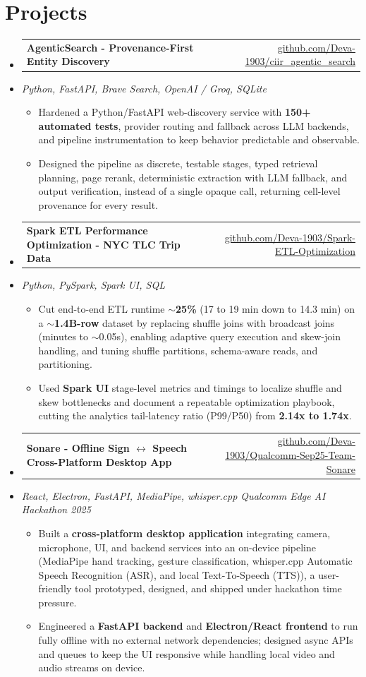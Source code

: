 \documentclass[letterpaper,10pt]{article}
\makeatletter
\newcommand{\resumeItem}[1]{
  \item\small{#1\vspace{-1pt}}
}
\newcommand{\resumeProjectHeading}[2]{
    \item
    \begin{tabular*}{0.985\textwidth}[t]{l@{\extracolsep{\fill}}r}
      \small\textbf{#1} & \small #2 \\
    \end{tabular*}\vspace{-5pt}
}
\newcommand{\resumeProjectSubheading}[1]{
  \vspace{-2pt}\item[] {\small\textcolor{ResumeSlate}{\emph{#1}}}\vspace{-3pt}
}
\newcommand{\resumeSubHeadingListStart}{\begin{itemize}[leftmargin=0.0in, label={}, itemsep=2pt, topsep=2pt]}
\newcommand{\resumeSubHeadingListEnd}{\end{itemize}}
\newcommand{\resumeItemListStart}{\begin{itemize}[leftmargin=0.18in, itemsep=2pt, topsep=1pt]}
\newcommand{\resumeItemListEnd}{\end{itemize}\vspace{-4pt}}
\makeatother
\begin{document}
\section{Projects}
\resumeSubHeadingListStart
  \resumeProjectHeading
    {AgenticSearch - Provenance-First Entity Discovery}
    {\href{https://github.com/Deva-1903/ciir_agentic_search}{github.com/Deva-1903/ciir\_agentic\_search}}
  \resumeProjectSubheading{Python, FastAPI, Brave Search, OpenAI / Groq, SQLite}
    \resumeItemListStart
      \resumeItem{Hardened a Python/FastAPI web-discovery service with \textbf{150+ automated tests}, provider routing and fallback across LLM backends, and pipeline instrumentation to keep behavior predictable and observable.}
      \resumeItem{Designed the pipeline as discrete, testable stages, typed retrieval planning, page rerank, deterministic extraction with LLM fallback, and output verification, instead of a single opaque call, returning cell-level provenance for every result.}
    \resumeItemListEnd
  \resumeProjectHeading
    {Spark ETL Performance Optimization - NYC TLC Trip Data}
    {\href{https://github.com/Deva-1903/Spark-ETL-Optimization}{github.com/Deva-1903/Spark-ETL-Optimization}}
  \resumeProjectSubheading{Python, PySpark, Spark UI, SQL}
    \resumeItemListStart
      \resumeItem{Cut end-to-end ETL runtime \textbf{$\sim$25\%} (17 to 19 min down to 14.3 min) on a \textbf{$\sim$1.4B-row} dataset by replacing shuffle joins with broadcast joins (minutes to $\sim$0.05s), enabling adaptive query execution and skew-join handling, and tuning shuffle partitions, schema-aware reads, and partitioning.}
      \resumeItem{Used \textbf{Spark UI} stage-level metrics and timings to localize shuffle and skew bottlenecks and document a repeatable optimization playbook, cutting the analytics tail-latency ratio (P99/P50) from \textbf{2.14x to 1.74x}.}
    \resumeItemListEnd
  \resumeProjectHeading
    {Sonare - Offline Sign \(\leftrightarrow\) Speech Cross-Platform Desktop App}
    {\href{https://github.com/Deva-1903/Qualcomm-Sep25-Team-Sonare}{github.com/Deva-1903/Qualcomm-Sep25-Team-Sonare}}
  \resumeProjectSubheading{React, Electron, FastAPI, MediaPipe, whisper.cpp \enspace\textbar\enspace Qualcomm Edge AI Hackathon 2025}
    \resumeItemListStart
      \resumeItem{Built a \textbf{cross-platform desktop application} integrating camera, microphone, UI, and backend services into an on-device pipeline (MediaPipe hand tracking, gesture classification, whisper.cpp Automatic Speech Recognition (ASR), and local Text-To-Speech (TTS)), a user-friendly tool prototyped, designed, and shipped under hackathon time pressure.}
      \resumeItem{Engineered a \textbf{FastAPI backend} and \textbf{Electron/React frontend} to run fully offline with no external network dependencies; designed async APIs and queues to keep the UI responsive while handling local video and audio streams on device.}
    \resumeItemListEnd
\resumeSubHeadingListEnd
\vspace{-4pt}
\end{document}
